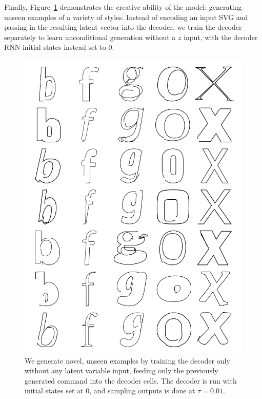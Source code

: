 Finally, Figure~\ref{fig:uncond} demonstrates the creative ability of the model: generating unseen examples of a variety of styles.
Instead of encoding an input SVG and passing in the resulting latent vector into the decoder, we train the decoder separately to learn unconditional generation without a $z$ input, with the decoder RNN initial states instead set to 0.
\begin{figure}[h]
    \centering
	\includegraphics[width=\textwidth]{figures/uncond}
    \caption[Unconditional generation for the single-class model on letter glyphs]
    {We generate novel, unseen examples by training the decoder only without any latent variable input, feeding only the previously generated command into the decoder cells.
    The decoder is run with initial states set at 0, and sampling outputs is done at $\tau=0.01$.
    \label{fig:uncond}}
\end{figure}
